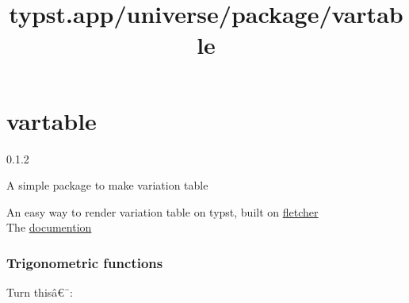 \title{typst.app/universe/package/vartable}

\label{banner}
\section{vartable}\label{vartable}

{ 0.1.2 }

A simple package to make variation table

\label{readme}
An easy way to render variation table on typst, built on
\href{https://github.com/Jollywatt/typst-fletcher}{fletcher}\\
The
\href{https://github.com/Le-foucheur/Typst-VarTable/blob/main/documentation.pdf}{documention}

\begin{Shaded}
\begin{Highlighting}[]
\end{Highlighting}
\end{Shaded}

\subsubsection{Trigonometric functions}\label{trigonometric-functions}

Turn thisâ€¯:

